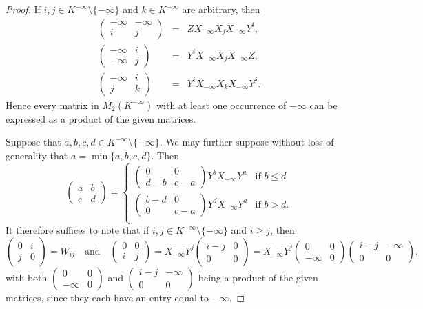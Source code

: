 \documentclass{amsart}
\newcommand{\mat}[4]{\begin{pmatrix}#1&#2\\#3&#4\end{pmatrix}}
\newcommand{\tmat}[4]{\left(\begin{smallmatrix}#1&#2\\#3&#4\end{smallmatrix}\right)}
\numberwithin{equation}{section}
\theoremstyle{definition}
\begin{document}
\begin{proof}
  If $i, j\in K^{-\infty}\setminus\{-\infty\}$ and $k\in K^{-\infty}$ are
  arbitrary, then 
  \begin{eqnarray*}
    \mat {-\infty}{-\infty}ij & = & ZX_{-\infty}X_jX_{-\infty}Y^i,\\
    \mat {-\infty}i{-\infty}j & = & Y^iX_{-\infty}X_jX_{-\infty}Z, \\
    \mat{-\infty}ijk & = & Y^iX_{-\infty}X_kX_{-\infty}Y^j.
  \end{eqnarray*}
  Hence every matrix in $M_2(K^{-\infty})$ with at least one occurrence of
  $-\infty$ can be expressed as a product of the given matrices.

  Suppose that $a, b, c, d\in K^{-\infty} \setminus \{-\infty\}$. We may further
  suppose without loss of generality that $a = \min\{a, b, c, d\}$. Then 
  \begin{equation*}
    \begin{pmatrix}
      a & b \\
      c & d
    \end{pmatrix}
    = 
    \begin{cases}
      \begin{pmatrix}
        0     & 0     \\
        d - b & c - a
      \end{pmatrix}
       Y ^ b X_{-\infty} Y ^ a & \text{if } b\leq d \\
      \begin{pmatrix}
        b - d & 0     \\
        0     & c - a
      \end{pmatrix}
       Y ^ d X_{-\infty} Y ^ a & \text{if } b > d. \\
    \end{cases}
  \end{equation*}
  It therefore suffices to note that if $i, j\in K^{-\infty} \setminus
  \{-\infty\}$ and
  $i \geq j$, then 
  \begin{equation*}
    \begin{pmatrix}
      0 & i \\
      j & 0
    \end{pmatrix}
    = 
    W_{ij}
    \quad \text{and} \quad
    \begin{pmatrix}
      0 & 0 \\
      i & j
    \end{pmatrix}
    = 
    X_{-\infty}Y^j\mat{i-j}000 = X_{-\infty}Y^j\mat00{-\infty}0\mat{i-j}{-\infty}00,
  \end{equation*}
  with both $\tmat00{-\infty}0$ and $\tmat{i-j}{-\infty}00$ being a product of
  the given matrices, since they each have an entry equal to $-\infty$.
\end{proof}
\end{document}
